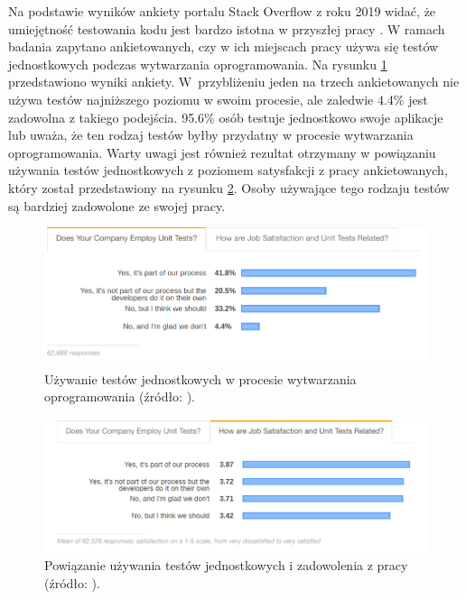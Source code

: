 Na podstawie wyników ankiety portalu Stack Overflow z roku 2019 widać, że umiejętność testowania kodu jest bardzo istotna w przyszłej pracy \cite{stack-overflow-survey}.
W ramach badania zapytano ankietowanych, czy w ich miejscach pracy używa się testów jednostkowych podczas wytwarzania oprogramowania.
Na rysunku \ref{fig:unit-tests-use} przedstawiono wyniki ankiety.
W~przybliżeniu jeden na trzech ankietowanych nie używa testów najniższego poziomu w swoim procesie, ale zaledwie 4.4\% jest zadowolna z takiego podejścia.
95.6\% osób testuje jednostkowo swoje aplikacje lub uważa, że ten rodzaj testów byłby przydatny w procesie wytwarzania oprogramowania.
Warty uwagi jest również rezultat otrzymany w powiązaniu używania testów jednostkowych z poziomem satysfakcji z pracy ankietowanych, który został przedstawiony na rysunku \ref{fig:unit-tests-satisfaction}.
Osoby używające tego rodzaju testów są bardziej zadowolone ze swojej pracy.

\begin{figure}[h]
    \centering
    \includegraphics[width = 13cm]{chapter02/unit-tests-use.png}
    \caption{Używanie testów jednostkowych w procesie wytwarzania oprogramowania (źródło: \cite{stack-overflow-survey}).}
    \label{fig:unit-tests-use}
\end{figure}

\begin{figure}[h]
    \centering
    \includegraphics[width = 13cm]{chapter02/unit-tests-satisfaction.png}
    \caption{Powiązanie używania testów jednostkowych i zadowolenia z pracy (źródło: \cite{stack-overflow-survey}).}
    \label{fig:unit-tests-satisfaction}
\end{figure}

